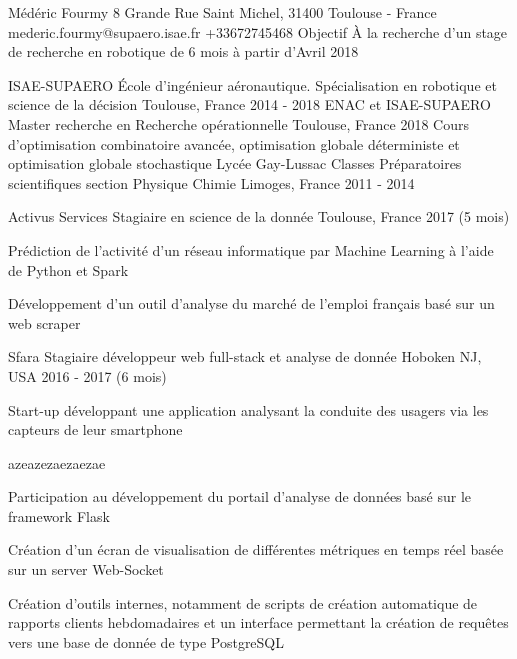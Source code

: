 \documentclass[11pt, a4paper, final]{resume}
\begin{document}
	\header
		{Médéric}
		{Fourmy}
		{8 Grande Rue Saint Michel, 31400 Toulouse - France}
		{mederic.fourmy@supaero.isae.fr}
		{+33672745468}
		{Objectif}
		{À la recherche d'un stage de recherche en robotique de 6 mois à partir d'Avril 2018	}


	\begin{cventries}
		\cventry
		{ISAE-SUPAERO}
		{École d'ingénieur aéronautique. Spécialisation en robotique et science de la décision}
		{Toulouse, France}
		{2014 - 2018}
		{}
		\cventry
		{ENAC et ISAE-SUPAERO}
		{Master recherche en Recherche opérationnelle}
		{Toulouse, France}
		{2018}
		{Cours d'optimisation combinatoire avancée, optimisation globale déterministe et optimisation globale stochastique}
		\cventry
		{Lycée Gay-Lussac}
		{Classes Préparatoires scientifiques section Physique Chimie}
		{Limoges, France}
		{2011 - 2014}
		{}
	\end{cventries}

	\cvsection{Expérience professionnelle}
	\begin{cventries}
		\cventry
		{Activus Services}
		{Stagiaire en science de la donnée}
		{Toulouse, France}
		{2017 (5 mois)}
		{
			\begin{cvitems}{}
				\item Prédiction de l'activité d'un réseau informatique par Machine Learning à l'aide de Python et Spark
				\item Développement d'un outil d'analyse du marché de l'emploi français basé sur un web scraper
			\end{cvitems}
		}
		\cventry
		{Sfara}
		{Stagiaire développeur web full-stack et analyse de donnée}
		{Hoboken NJ, USA}
		{2016 - 2017 (6 mois)}
		{
			Start-up développant une application analysant la conduite des usagers via les capteurs de leur smartphone
			\begin{cvitems}{azeazezaezaezae}
				\item Participation au développement du portail d'analyse de données basé sur le framework Flask
				\item Création d'un écran de visualisation de différentes métriques en temps réel basée sur un server Web-Socket
				\item Création d'outils internes, notamment de scripts de création automatique de rapports clients hebdomadaires
							et un interface permettant la création de requêtes vers une base de donnée de type PostgreSQL
			\end{cvitems}
		}
	\end{cventries}
\end{document}
